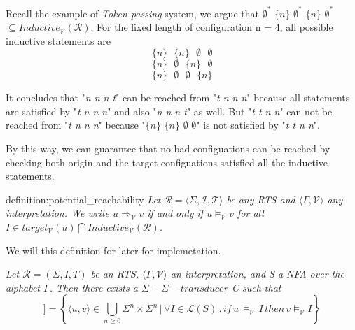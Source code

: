 Recall the example of \textit{Token passing} system,
we argue that $\emptyset^*$ $\lbrace n \rbrace$ $\emptyset^*$ $\lbrace n \rbrace$ $\emptyset^*$
$\subseteq Inductive_{\mathcal{V}}(\mathcal{R})$. For the fixed
length of configuration n = 4, all possible inductive statements
are 
\[
    \lbrace n \rbrace\,\,\,\, \lbrace n \rbrace \,\,\,\,  \emptyset \,\,\,\, \emptyset
\]
\[
    \lbrace n \rbrace\,\,\,\, \emptyset \,\,\,\, \lbrace n \rbrace \,\,\,\,  \emptyset
\]
\[
    \lbrace n \rbrace \,\,\,\, \emptyset \,\,\,\, \emptyset \,\,\,\, \lbrace n \rbrace
\]

It concludes that "\textit{n n n t}" can be reached from "\textit{t n n n}" because
all statements are satisfied by "\textit{t n n n}" and also "\textit{n n n t}" as well.
But "\textit{t t n n}" can not be reached from "\textit{t n n n}" because 
"$\lbrace n \rbrace$ $\lbrace n \rbrace$  $\emptyset$  $\emptyset$"
is not satisfied by "\textit{t t n n}".

By this way, we can guarantee that no bad configuations can be reached
by checking both origin and the target configuations satisfied all
the inductive statements.

\begin{theo}{definition:potential_reachability}
    \textit{
   Let $\mathcal{R} = \langle \Sigma, \mathcal{I}, \mathcal{T} \rangle$ be any \textit{RTS}
   and $\langle \Gamma, \mathcal{V} \rangle$ any interpretation.
   We write $u \Rightarrow_{\mathcal{V}} v$ if and only if $u \models_{\mathcal{V}} v$
   for all $I \in target_\mathcal{V}(u) \bigcap Inductive_\mathcal{V}(\mathcal{R})$.
   }
\end{theo}

We will this definition for later for implemetation. 

\begin{lemma}\label{lemma:abstractly_reachable}
    \cite{latex}
\end{lemma}
\textit{
    Let $\mathcal{R} = (\Sigma, I, T)$ be an RTS, $\langle \Gamma, \mathcal{V} \rangle$ an interpretation, 
    and S a NFA over the alphabet $\Gamma$. Then there exists a  $\Sigma-\Sigma-transducer$ C such that
}
\begin{equation*}
    [[C]] = \left\lbrace \langle u,v\rangle \in \bigcup_{n \geq 0} \Sigma^n \times \Sigma^n \, | \, \forall I \in \mathcal{L}(S) \, . \, if \, u \, \models_{\mathcal{V}} \, I \, then \, v \models_{\mathcal{V}} I \right\rbrace
\end{equation*}